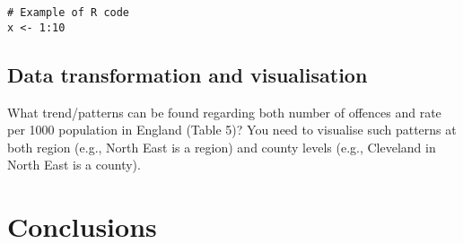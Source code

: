 \documentclass{article}
\begin{document}
\begin{lstlisting}[style=RStyle, caption={Example of R Code}]
# Example of R code
x <- 1:10
\end{lstlisting}

\subsection{Data transformation and visualisation}

What trend/patterns can be found regarding both number of offences and rate per 1000
population in England (Table 5)?
You need to visualise such patterns at both region (e.g., North East is a region) and
county levels (e.g., Cleveland in North East is a county).

\section{Conclusions}

\end{document}
